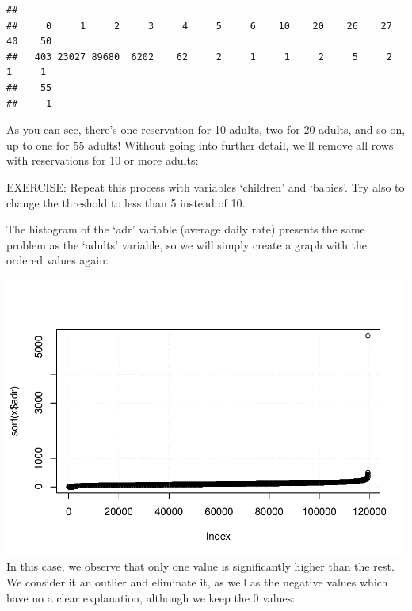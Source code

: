 \documentclass[
]{article}
\newenvironment{Shaded}{\begin{snugshade}}{\end{snugshade}}
\newcommand{\DecValTok}[1]{\textcolor[rgb]{0.00,0.00,0.81}{#1}}
\newcommand{\FunctionTok}[1]{\textcolor[rgb]{0.13,0.29,0.53}{\textbf{#1}}}
\newcommand{\NormalTok}[1]{#1}
\newcommand{\OtherTok}[1]{\textcolor[rgb]{0.56,0.35,0.01}{#1}}
\newcommand{\SpecialCharTok}[1]{\textcolor[rgb]{0.81,0.36,0.00}{\textbf{#1}}}
\begin{document}
\begin{Shaded}
\end{Shaded}

\begin{verbatim}
## 
##     0     1     2     3     4     5     6    10    20    26    27    40    50 
##   403 23027 89680  6202    62     2     1     1     2     5     2     1     1 
##    55 
##     1
\end{verbatim}

As you can see, there's one reservation for 10 adults, two for 20
adults, and so on, up to one for 55 adults! Without going into further
detail, we'll remove all rows with reservations for 10 or more adults:

\begin{Shaded}
\end{Shaded}

EXERCISE: Repeat this process with variables `children' and `babies'.
Try also to change the threshold to less than 5 instead of 10.

The histogram of the `adr' variable (average daily rate) presents the
same problem as the `adults' variable, so we will simply create a graph
with the ordered values again:

\begin{Shaded}
\end{Shaded}

\includegraphics{hotel_bookings_files/figure-latex/plot_adr-1.pdf} In
this case, we observe that only one value is significantly higher than
the rest. We consider it an outlier and eliminate it, as well as the
negative values which have no a clear explanation, although we keep the
0 values:
\end{document}
